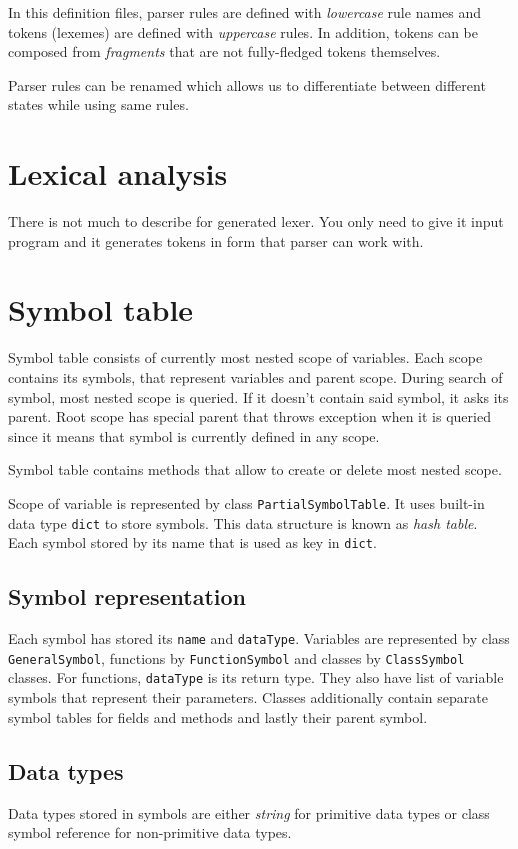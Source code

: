 \documentclass[a4paper, 11pt]{article}
\begin{document}
In this definition files, parser rules are defined with \textit{lowercase} rule names and tokens (lexemes) are defined with \textit{uppercase} rules. In addition, tokens can be composed from \textit{fragments} that are not fully-fledged tokens themselves.

Parser rules can be renamed which allows us to differentiate between different states while using same rules.

\section{Lexical analysis}
There is not much to describe for generated lexer. You only need to give it input program and it generates tokens in form that parser can work with.

\section{Symbol table}

Symbol table consists of currently most nested scope of variables. Each scope contains its symbols, that represent variables and parent scope. During search of symbol, most nested scope is queried. If it doesn't contain said symbol, it asks its parent. Root scope has special parent that throws exception when it is queried since it means that symbol is currently defined in any scope.

Symbol table contains methods that allow to create or delete most nested scope.

Scope of variable is represented by class \texttt{PartialSymbolTable}. It uses built-in data type \texttt{dict} to store symbols. This data structure is known as \textit{hash table}. Each symbol stored by its name that is used as key in \texttt{dict}.

\subsection{Symbol representation}
Each symbol has stored its \texttt{name} and \texttt{dataType}. Variables are represented by class \texttt{GeneralSymbol}, functions by \texttt{FunctionSymbol} and classes by \texttt{ClassSymbol} classes. For functions, \texttt{dataType} is its return type. They also have list of variable symbols that represent their parameters. Classes additionally contain separate symbol tables for fields and methods and lastly their parent symbol.

\subsection*{Data types}
Data types stored in symbols are either \textit{string} for primitive data types or class symbol reference for non-primitive data types.
\end{document}
